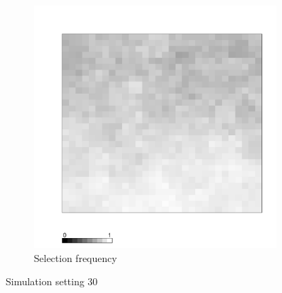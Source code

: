 \documentclass[authoryear, review, 11pt]{elsarticle}
\begin{document}
\begin{figure}
	\begin{subfigure}[b]{0.45\textwidth}
	\centering
		\includegraphics[width=\textwidth]{../../figures/simulation/X1.15.30.selection.pdf}
		\caption{Selection frequency}
	\end{subfigure}
	\caption{Simulation setting 30}
\end{figure}
\end{document}
